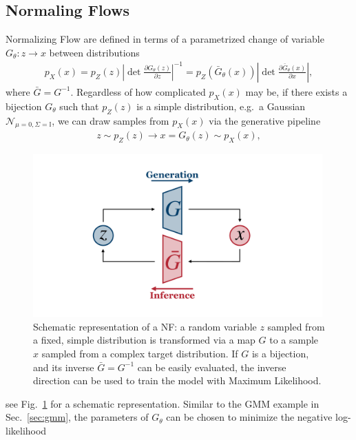 \subsection{Normaling Flows}\label{intro:normflow}
Normalizing Flow  are defined in terms of a parametrized change of variable $G_{\theta}: z \rightarrow x$ between distributions
%
\begin{align}\label{eq:nf}
p_X(x) = p_Z(z) \left|\det \frac{\partial G_{\theta}(z)}{\partial z}\right|^{-1} = p_Z(\bar{G}_{\theta}(x)) \left|\det \frac{\partial \bar{G}_{\theta}(x)}{\partial x}\right|,
\end{align}
%
where $\bar{G} = G^{-1}$.
Regardless of how complicated $p_{X}(x)$ may be, if there exists a bijection $G_{\theta}$ such that $p_Z(z)$ is a simple distribution, e.g.\ a Gaussian $\mathcal{N}_{\mu=0, \Sigma=\mathbb{I}}$, we can draw samples from $p_{X}(x)$ via the generative pipeline
%
\begin{align}
z \sim p_Z(z) \longrightarrow x = G_{\theta}(z)  \sim p_{X}(x),
\end{align}
%
%
\begin{figure}[t]
\centering
\includegraphics[page = 1, width=0.99\textwidth]{./figures/inn}
\caption{Schematic representation of a NF: a random variable $z$ sampled from a fixed, simple distribution is transformed via a map $G$ to a sample $x$ sampled from a complex target distribution. If $G$ is a bijection, and its inverse $\bar{G} = G^{-1}$ can be easily evaluated, the inverse direction can be used to train the model with Maximum Likelihood.}
\label{fig:NF}
\end{figure}
%
see Fig.~\ref{fig:NF} for a schematic representation. Similar to the GMM example in Sec.~\ref{sec:gmm}, the parameters of $G_{\theta}$ can be chosen to minimize the negative log-likelihood
